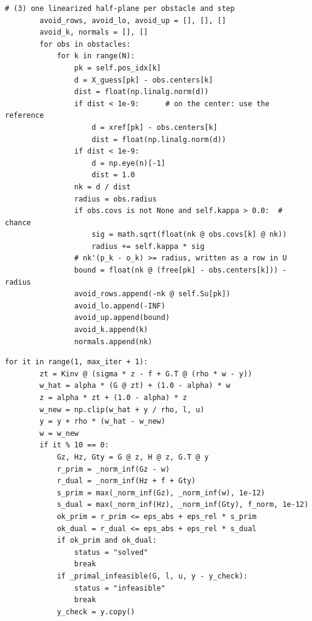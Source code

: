 \begin{lstlisting}[caption={Linearized avoidance rows in \code{MPC.step} (from \code{code/ch21\_mpc.py}). \code{X\_guess} is the shifted previous plan, \code{free} the free response $\mat{S}_x\state_0$, \code{pos\_idx[k]} the indices of $\pos_k$ in the stacked state.},label={lst:ch21-avoid},gobble=8]
        # (3) one linearized half-plane per obstacle and step
        avoid_rows, avoid_lo, avoid_up = [], [], []
        avoid_k, normals = [], []
        for obs in obstacles:
            for k in range(N):
                pk = self.pos_idx[k]
                d = X_guess[pk] - obs.centers[k]
                dist = float(np.linalg.norm(d))
                if dist < 1e-9:      # on the center: use the reference
                    d = xref[pk] - obs.centers[k]
                    dist = float(np.linalg.norm(d))
                if dist < 1e-9:
                    d = np.eye(n)[-1]
                    dist = 1.0
                nk = d / dist
                radius = obs.radius
                if obs.covs is not None and self.kappa > 0.0:  # chance
                    sig = math.sqrt(float(nk @ obs.covs[k] @ nk))
                    radius += self.kappa * sig
                # nk'(p_k - o_k) >= radius, written as a row in U
                bound = float(nk @ (free[pk] - obs.centers[k])) - radius
                avoid_rows.append(-nk @ self.Su[pk])
                avoid_lo.append(-INF)
                avoid_up.append(bound)
                avoid_k.append(k)
                normals.append(nk)
\end{lstlisting}

\begin{lstlisting}[caption={The ADMM iteration of \code{solve\_qp} (from \code{code/ch21\_mpc.py}): the linear system with the precomputed inverse, the relaxed update, the projection onto the bounds, the multiplier update, and every ten iterations the residual test and the infeasibility certificate.},label={lst:ch21-admm},gobble=4]
    for it in range(1, max_iter + 1):
        zt = Kinv @ (sigma * z - f + G.T @ (rho * w - y))
        w_hat = alpha * (G @ zt) + (1.0 - alpha) * w
        z = alpha * zt + (1.0 - alpha) * z
        w_new = np.clip(w_hat + y / rho, l, u)
        y = y + rho * (w_hat - w_new)
        w = w_new
        if it % 10 == 0:
            Gz, Hz, Gty = G @ z, H @ z, G.T @ y
            r_prim = _norm_inf(Gz - w)
            r_dual = _norm_inf(Hz + f + Gty)
            s_prim = max(_norm_inf(Gz), _norm_inf(w), 1e-12)
            s_dual = max(_norm_inf(Hz), _norm_inf(Gty), f_norm, 1e-12)
            ok_prim = r_prim <= eps_abs + eps_rel * s_prim
            ok_dual = r_dual <= eps_abs + eps_rel * s_dual
            if ok_prim and ok_dual:
                status = "solved"
                break
            if _primal_infeasible(G, l, u, y - y_check):
                status = "infeasible"
                break
            y_check = y.copy()
\end{lstlisting}

